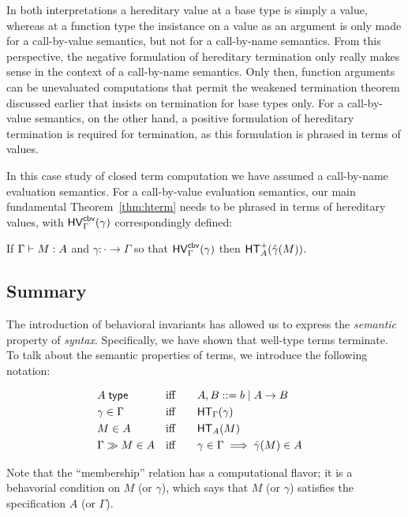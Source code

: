\documentclass{article}
\begin{document}
In both interpretations a hereditary value at a base type is simply a value, whereas at a
function type the insistance on a value as an argument is only made for a call-by-value
semantics, but not for a call-by-name semantics.  From this perspective, the negative
formulation of hereditary termination only really makes sense in the context of a call-by-name
semantics.  Only then, function arguments can be unevaluated computations that permit the weakened
termination theorem discussed earlier that insists on termination for base types only.  For a
call-by-value semantics, on the other hand, a positive formulation of hereditary termination is
required for termination, as this formulation is phrased in terms of values.

In this case study of closed term computation we have assumed a call-by-name evaluation
semantics.  For a call-by-value evaluation semantics, our main fundamental
Theorem~\ref{thm:hterm} needs to be phrased in terms of hereditary values, with
$\mathsf{HV}^{\mathsf{cbv}}_{\Gamma}(\gamma)$ correspondingly defined:

\begin{theorem}\label{thm:hcbvterm}
  If $\Gamma \vdash M : A$ and $\gamma : \cdot \to \Gamma$ so that
  $\mathsf{HV}^{\mathsf{cbv}}_{\Gamma}(\gamma)$ then $\mathsf{HT}^+_{A}(\hat{\gamma}(M))$.
\end{theorem}

\subsection{Summary}

The introduction of behavioral invariants has allowed us to express the \emph{semantic}
property of \emph{syntax}.  Specifically, we have shown that well-type terms terminate.  To
talk about the semantic properties of terms, we introduce the following notation:

\begin{align*}
&A \; \mathsf{type} &&\text{iff}  \quad \quad A, B ::= b \mid A \to B&\\
&\gamma \in \Gamma &&\text{iff} \quad \quad \mathsf{HT}_{\Gamma}(\gamma)&\\
&M \in A &&\text{iff} \quad \quad \mathsf{HT}_{A}(M)&\\
&\Gamma \gg M \in A &&\text{iff} \quad \quad \gamma \in \Gamma \implies \hat\gamma(M) \in A&
\end{align*}

Note that the ``membership'' relation has a computational flavor; it is a behavorial condition
on $M$ (or $\gamma$), which says that $M$ (or $\gamma$) satisfies the specification $A$ (or
$\Gamma$).
\end{document}
